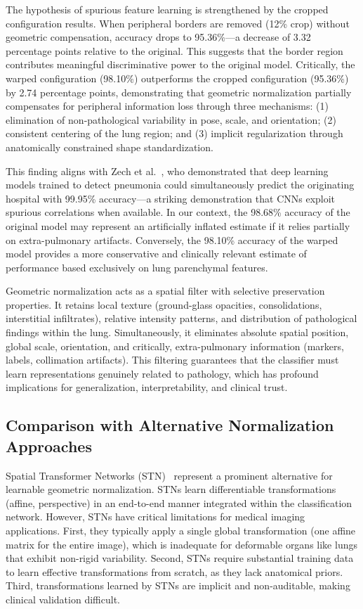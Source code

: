 \documentclass[applsci,article,submit,pdftex,moreauthors]{Definitions/mdpi}
\begin{document}
The hypothesis of spurious feature learning is strengthened by the cropped configuration results. When peripheral borders are removed (12\% crop) without geometric compensation, accuracy drops to 95.36\%---a decrease of 3.32 percentage points relative to the original. This suggests that the border region contributes meaningful discriminative power to the original model. Critically, the warped configuration (98.10\%) outperforms the cropped configuration (95.36\%) by 2.74 percentage points, demonstrating that geometric normalization partially compensates for peripheral information loss through three mechanisms: (1) elimination of non-pathological variability in pose, scale, and orientation; (2) consistent centering of the lung region; and (3) implicit regularization through anatomically constrained shape standardization.

This finding aligns with Zech et al.~\cite{zech2018variable}, who demonstrated that deep learning models trained to detect pneumonia could simultaneously predict the originating hospital with 99.95\% accuracy---a striking demonstration that CNNs exploit spurious correlations when available. In our context, the 98.68\% accuracy of the original model may represent an artificially inflated estimate if it relies partially on extra-pulmonary artifacts. Conversely, the 98.10\% accuracy of the warped model provides a more conservative and clinically relevant estimate of performance based exclusively on lung parenchymal features.

Geometric normalization acts as a spatial filter with selective preservation properties. It retains local texture (ground-glass opacities, consolidations, interstitial infiltrates), relative intensity patterns, and distribution of pathological findings within the lung. Simultaneously, it eliminates absolute spatial position, global scale, orientation, and critically, extra-pulmonary information (markers, labels, collimation artifacts). This filtering guarantees that the classifier must learn representations genuinely related to pathology, which has profound implications for generalization, interpretability, and clinical trust.

\subsection{Comparison with Alternative Normalization Approaches}

Spatial Transformer Networks (STN)~\cite{jaderberg2015spatial} represent a prominent alternative for learnable geometric normalization. STNs learn differentiable transformations (affine, perspective) in an end-to-end manner integrated within the classification network. However, STNs have critical limitations for medical imaging applications. First, they typically apply a single global transformation (one affine matrix for the entire image), which is inadequate for deformable organs like lungs that exhibit non-rigid variability. Second, STNs require substantial training data to learn effective transformations from scratch, as they lack anatomical priors. Third, transformations learned by STNs are implicit and non-auditable, making clinical validation difficult.
\end{document}
